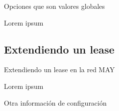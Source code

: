 \begin{frame}{Opciones que son valores globales}

    Lorem ipsum
    
\end{frame}

\subsection{Extendiendo un lease} %
\label{sub:Extendiendo un lease}


\begin{frame}{Extendiendo un lease en la red MAY} 

    Lorem ipsum
    
\end{frame}

\begin{frame}{Otra información de configuración}
    


\end{frame}



